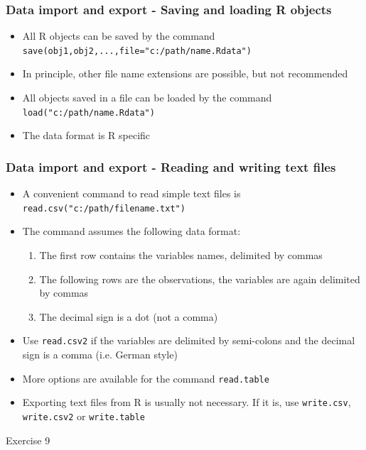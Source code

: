 \documentclass[xcolor={svgnames},10pt,
handout
]{beamer}
\begin{document}
\begin{frame}
\frametitle{Data import and export - Saving and loading R objects}
\begin{itemize}
\item All R objects can be saved by the command\newline
\texttt{save(obj1,obj2,...,file="c:/path/name.Rdata")}
\item In principle, other file name extensions are possible, \newline
but not recommended
\item All objects saved in a file can be loaded by the command\newline
\texttt{load("c:/path/name.Rdata")}
\item The data format is R specific
\end{itemize}
\end{frame}

\begin{frame}
\frametitle{Data import and export - Reading and writing text files}
\begin{itemize}
\item A convenient command to read simple text files is \newline
\texttt{read.csv("c:/path/filename.txt")}
\item The command assumes the following data format:
\begin{enumerate}
\item The first row contains the variables names, delimited by commas
\item The following rows are the observations, the variables are again
delimited by commas
\item The decimal sign is a dot (not a comma)
\end{enumerate}
\item Use \texttt{read.csv2} if the variables are delimited by semi-colons
and the decimal sign is a comma (i.e. German style)
\item More options are available for the command \texttt{read.table}
\item Exporting text files from R is usually not necessary. If it is, use 
\texttt{write.csv}, \texttt{write.csv2} or \texttt{write.table}
\end{itemize}
\end{frame}

\begin{frame}[standout]
Exercise 9
\end{frame}
\end{document}
